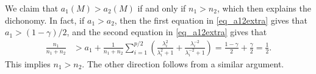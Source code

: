 We claim that $a_1(M) > a_2 (M)$ if and only if $n_1 > n_2$, which then explains the dichonomy. In fact, if $a_1>a_2$, then the first equation in \eqref{eq_a12extra} gives that $a_1> (1-\gamma)/2$, and the second equation in  \eqref{eq_a12extra} gives that
\begin{align*}
 \frac{n_1}{n_1 + n_2} &> a_1 + \frac{1}{n_1+n_2} \sum_{i=1}^{p/2}\left(\frac{\lambda_i^2}{\lambda_i^2+1}+\frac{\lambda_i^{-2}}{\lambda_i^{-2}+1}\right) = \frac{1-\gamma}{2}+\frac{\gamma}{2}=\frac{1}{2}.
\end{align*}
This implies $n_1>n_2$. The other direction follows from a similar argument. %


\iffalse
In fact, due to the fact that $M=M^{-1}$, $a_1$ and $a_2$ play symmetric roles in equations \eqref{eq_a12extra000} and \eqref{eq_a12extra}.
Hence, when $n_1 \ge n_2$, we have that $a_1 \ge a_2$, hence $a_1 \ge \frac{1}{2}(1 - \frac{p}{n_1 + n_2 - p}) = \frac{n_1 + n_2}{2 (n_1 + n_2 - p)}$.
The other case when $n_1 < n_2$ is similar.
A formal proof follows easily from the self-consistent equations \eqref{lem_cov_shift_eq} and we omit the details.
Thus, we conclude that if $n_1 \ge n_2$, then $f(\lambda) > f(1)$.
If $n_1< n_2$, then $f(\lambda)< f(1)$.
\fi


